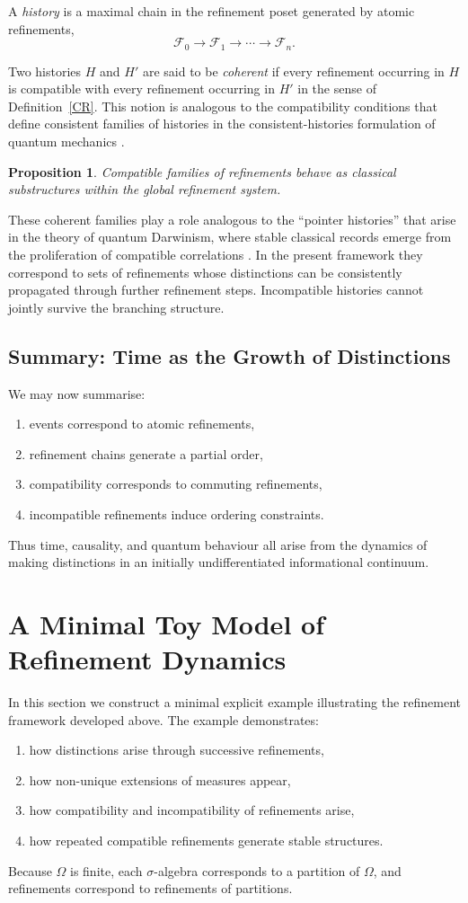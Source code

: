 \documentclass[
 amsmath,amssymb,
  onecolumn %
]{revtex4-2}
\newtheorem{proposition}[theorem]{Proposition}
\begin{document}
A \emph{history} is a maximal chain in the refinement poset generated by
atomic refinements,
\[
\mathcal F_0 \to \mathcal F_1 \to \cdots \to \mathcal F_n .
\]

Two histories $H$ and $H'$ are said to be \emph{coherent} if every
refinement occurring in $H$ is compatible with every refinement
occurring in $H'$ in the sense of Definition~\ref{CR}. This notion
is analogous to the compatibility conditions that define consistent
families of histories in the consistent-histories formulation of
quantum mechanics \cite{Gr}.
\begin{proposition} 
Compatible families of refinements behave as classical substructures
within the global refinement system.
\end{proposition} 
These coherent families play a role analogous to the “pointer histories”
that arise in the theory of quantum Darwinism, where stable classical
records emerge from the proliferation of compatible correlations
\cite{ZurekQD}. In the present framework they correspond to sets of
refinements whose distinctions can be consistently propagated through
further refinement steps. Incompatible histories cannot jointly survive
the branching structure.


\subsection{Summary: Time as the Growth of Distinctions} 
We may now summarise:
\begin{enumerate}
\item events correspond to atomic refinements,
\item refinement chains generate a partial order,
\item compatibility corresponds to commuting refinements,
\item incompatible refinements induce ordering constraints.
\end{enumerate}
Thus time, causality, and quantum behaviour all arise from the dynamics of making distinctions in an initially undifferentiated informational continuum.




\section{A Minimal Toy Model of Refinement Dynamics}\label{sec6}
In this section we construct a minimal explicit example illustrating the
refinement framework developed above. The example demonstrates:
\begin{enumerate}[leftmargin=2em]
\item how distinctions arise through successive refinements,
\item how non-unique extensions of measures appear,
\item how compatibility and incompatibility of refinements arise,
\item how repeated compatible refinements generate stable structures.
\end{enumerate}
Because $\Omega$ is finite, each $\sigma$-algebra corresponds to a
partition of $\Omega$, and refinements correspond to refinements of
partitions.
\end{document}
